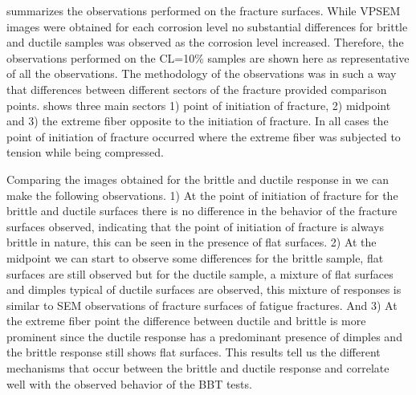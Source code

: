 

 summarizes the observations performed on the fracture surfaces.  While VPSEM images were obtained for each corrosion level no substantial differences for brittle and ductile samples was observed as the corrosion level increased. Therefore, the observations performed on the CL=10\% samples are shown here as representative of all the observations. The methodology of the observations was in such a way that differences between different sectors of the fracture provided comparison points.  shows three main sectors 1) point of initiation of fracture, 2) midpoint and 3) the extreme fiber opposite to the initiation of fracture. In all cases the point of initiation of fracture occurred where the extreme fiber was subjected to tension while being compressed. 

Comparing the images obtained for the brittle and ductile response in  we can make the following observations. 1) At the point of initiation of fracture for the brittle and ductile surfaces there is no difference in the behavior of the fracture surfaces observed, indicating that the point of initiation of fracture is always brittle in nature, this can be seen in the presence of flat surfaces. 2) At the midpoint we can start to observe some differences for the brittle sample, flat surfaces are still observed but for the ductile sample, a mixture of flat surfaces and dimples typical of ductile surfaces are observed, this mixture of responses is similar to SEM observations of fracture surfaces of fatigue fractures. And 3) At the extreme fiber point the difference between ductile and brittle is more prominent since the ductile response has a predominant presence of dimples and the  brittle response still shows flat surfaces. This results tell us the different mechanisms that occur between the brittle and ductile response and correlate well with the observed behavior of the BBT tests.

